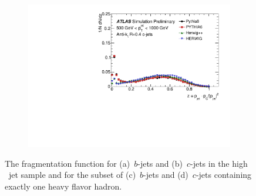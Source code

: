 \begin{figure}
\begin{subfigure}[]{0.45\textwidth}
\end{subfigure}
 \begin{subfigure}[]{0.45\textwidth}
\includegraphics[width=\textwidth]{evtgen/figures/Frag/Jz4/WithIsolation/h_CFrag_SingleHad.pdf}
\end{subfigure}

\caption{The fragmentation function for (a)~$b$-jets and (b)~$c$-jets in the 
high \pT\ jet sample and for the subset
of (c)~$b$-jets and (d)~$c$-jets containing exactly one heavy flavor hadron.
}
\label{fig:jz4frag}
\end{figure}
